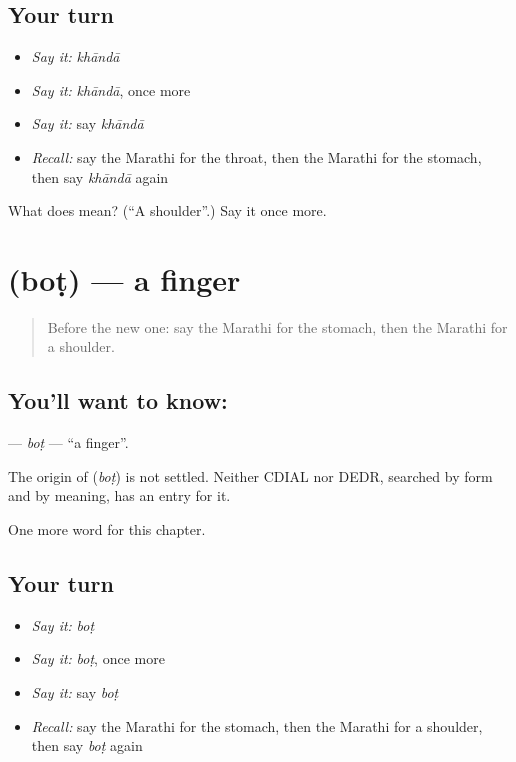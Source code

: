 \subsection*{Your turn}
\begin{itemize}
\raggedright
  \item \emph{Say it:} \emph{khāndā}
  \item \emph{Say it:} \emph{khāndā}, once more
  \item \emph{Say it:} say \emph{khāndā}
  \item \emph{Recall:} say the Marathi for the throat, then the Marathi for the stomach, then say \emph{khāndā} again
\end{itemize}

\begin{tcolorbox}[breakable,colback=teal!4,colframe=teal!35!black,title={Before you move on}]
What does  mean? (\textquotedblleft{}A shoulder\textquotedblright{}.) Say it once more.
\end{tcolorbox}
\section[\texorpdfstring{\mr{बोट} (boṭ)}{बोट (boṭ)}]{ (boṭ) — a finger}

\label{lesson:MR-C71-bot}



\begin{quote}
Before the new one: say the Marathi for the stomach, then the Marathi for a shoulder.
\end{quote}

\subsection*{You'll want to know: }
\textbf{} — \emph{boṭ} — \textquotedblleft{}a finger\textquotedblright{}.

\begin{cousinweb}
The origin of \textbf{} (\emph{boṭ}) is not settled. Neither CDIAL nor DEDR, searched by form and by meaning, has an entry for it.
\end{cousinweb}

\begin{grammarlens}[title={What you've built}]
One more word for this chapter.
\end{grammarlens}

\subsection*{Your turn}
\begin{itemize}
\raggedright
  \item \emph{Say it:} \emph{boṭ}
  \item \emph{Say it:} \emph{boṭ}, once more
  \item \emph{Say it:} say \emph{boṭ}
  \item \emph{Recall:} say the Marathi for the stomach, then the Marathi for a shoulder, then say \emph{boṭ} again
\end{itemize}

